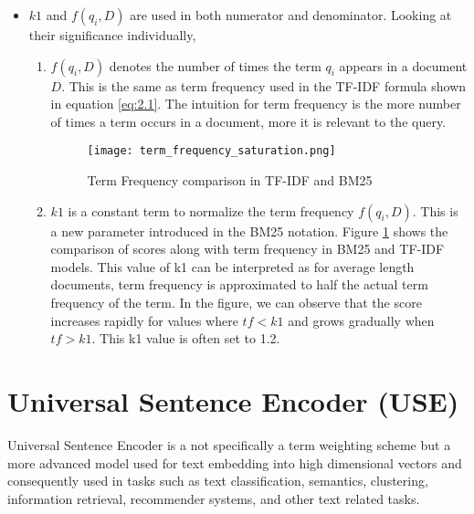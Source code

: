 \begin{itemize}
    \item $k1$ and $f(q_{i},D)$ are used in both numerator and denominator. Looking at their significance individually,
    \begin{enumerate}
        \item $f(q_{i},D)$ denotes the number of times the term $q_{i}$ appears in a document $D$. This is the same as term frequency used in the TF-IDF formula shown in equation \ref{eq:2.1}.
        The intuition for term frequency is the more number of times a term occurs in a document, more it is relevant to the query.
        \begin{figure}
            \centering
            \texttt{[image: term\_frequency\_saturation.png]}
            \caption{Term Frequency comparison in TF-IDF and BM25}
            \label{fig:tf-comparison}
        \end{figure}
        \item $k1$ is a constant term to normalize the term frequency $f(q_{i},D)$. This is a new parameter introduced in the BM25 notation. Figure \ref{fig:tf-comparison}  shows the comparison of scores along with term frequency in BM25 and TF-IDF models. This value of k1 can be interpreted as for average length documents, term frequency is approximated to half the actual term frequency of the term. In the figure, we can observe that the score increases rapidly for values where $tf < k1$ and grows gradually when $tf>k1$.
        This k1 value is often set to 1.2. 
        
        
    \end{enumerate}
    
\end{itemize}

\section{Universal Sentence Encoder (USE)}

Universal Sentence Encoder \cite{RN32} is a not specifically a term weighting scheme but a more advanced model used for text embedding into high dimensional vectors and consequently used in tasks such as text classification, semantics, clustering, information retrieval, recommender systems, and other text related tasks.

